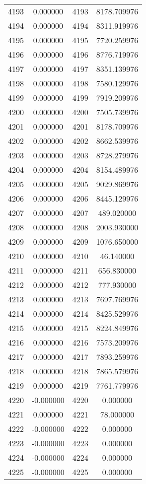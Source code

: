 \documentclass[12pt]{article}
\begin{document}
\begin{longtable}{@{}cccc@{}}
4193 & 0.000000 & 4193 & 8178.709976 \\
4194 & 0.000000 & 4194 & 8311.919976 \\
4195 & 0.000000 & 4195 & 7720.259976 \\
4196 & 0.000000 & 4196 & 8776.719976 \\
4197 & 0.000000 & 4197 & 8351.139976 \\
4198 & 0.000000 & 4198 & 7580.129976 \\
4199 & 0.000000 & 4199 & 7919.209976 \\
4200 & 0.000000 & 4200 & 7505.739976 \\
4201 & 0.000000 & 4201 & 8178.709976 \\
4202 & 0.000000 & 4202 & 8662.539976 \\
4203 & 0.000000 & 4203 & 8728.279976 \\
4204 & 0.000000 & 4204 & 8154.489976 \\
4205 & 0.000000 & 4205 & 9029.869976 \\
4206 & 0.000000 & 4206 & 8445.129976 \\
4207 & 0.000000 & 4207 & 489.020000 \\
4208 & 0.000000 & 4208 & 2003.930000 \\
4209 & 0.000000 & 4209 & 1076.650000 \\
4210 & 0.000000 & 4210 & 46.140000 \\
4211 & 0.000000 & 4211 & 656.830000 \\
4212 & 0.000000 & 4212 & 777.930000 \\
4213 & 0.000000 & 4213 & 7697.769976 \\
4214 & 0.000000 & 4214 & 8425.529976 \\
4215 & 0.000000 & 4215 & 8224.849976 \\
4216 & 0.000000 & 4216 & 7573.209976 \\
4217 & 0.000000 & 4217 & 7893.259976 \\
4218 & 0.000000 & 4218 & 7865.579976 \\
4219 & 0.000000 & 4219 & 7761.779976 \\
4220 & -0.000000 & 4220 & 0.000000 \\
4221 & 0.000000 & 4221 & 78.000000 \\
4222 & -0.000000 & 4222 & 0.000000 \\
4223 & -0.000000 & 4223 & 0.000000 \\
4224 & -0.000000 & 4224 & 0.000000 \\
4225 & -0.000000 & 4225 & 0.000000 \\

\end{longtable}
\end{document}
